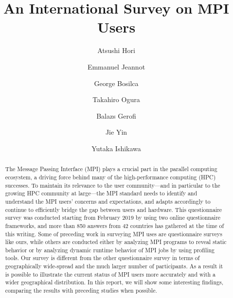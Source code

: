 \documentclass[preprint,5p,times]{elsarticle}
\begin{document}
\title{An International Survey on MPI Users}


\author[1]{Atsushi Hori}
\author[2]{Emmanuel Jeannot}
\author[3]{George Bosilca}
\author[1]{Takahiro Ogura}
\author[1]{Balazs Gerofi}
\author[1]{Jie Yin}
\author[1]{Yutaka Ishikawa}


\begin{abstract}
  The Message Passing Interface (MPI) plays a crucial part in the
  parallel computing ecosystem, a driving force behind many of the
  high-performance computing (HPC) successes. To maintain its relevance
  to the user community---and in particular to the growing HPC community
  at large---the MPI standard needs to identify and understand the MPI
  users' concerns and expectations, and adapts
  accordingly to continue to efficiently bridge the gap between users and hardware. This questionnaire survey was conducted starting from February
  2019 by using two online questionnaire frameworks, and more than 850
  answers from 42 countries has gathered at the time of this writing.
  Some of preceding work in surveying MPI uses are questionnaire surveys
  like ours, while others are conducted either by analyzing MPI programs
  to reveal static behavior or by analyzing dynamic runtime behavior of
  MPI jobs by using profiling tools. Our survey is different from the
  other questionnaire survey in terms of geographically wide-spread and
  the much larger number of participants. As a result it is possible to
  illustrate the current status of MPI users more accurately and with a
  wider geographical distribution. In this report, we will show some
  interesting findings, comparing the results with preceding studies
  when possible.
\end{abstract}
\end{document}
